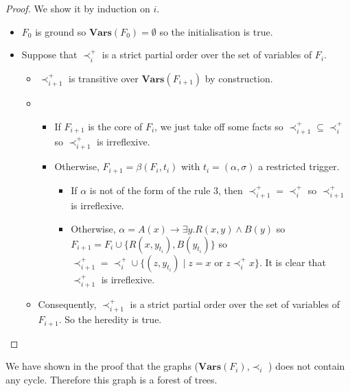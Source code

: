 \documentclass{article}
\theoremstyle{definition}
\newtheorem{definition}{Definition}[section]
\theoremstyle{remark}
\newcommand{\Vars}{\textbf{Vars}}
\begin{document}
\begin{proof}
We show it by induction on $i$.
\begin{itemize}
\item $F_0$ is ground so $\Vars(F_0) = \emptyset$ so the initialisation is true.
\item Suppose that $\prec^+_i$ is a strict partial order over the set of variables of $F_i$.
\begin{itemize}
\item $\prec^+_{i+1}$ is transitive over $\Vars(F_{i+1})$ by construction.
\item 
\begin{itemize}
\item If $F_{i+1}$ is the core of $F_i$, we just take off some facts so $\prec^+_{i+1} \subseteq \prec^+_{i}$  so $\prec^+_{i+1}$ is irreflexive.
\item Otherwise, $F_{i+1}= \beta(F_{i},t_i)$ with $t_i = (\alpha,\sigma)$ a restricted trigger. 
\begin{itemize}
\item If $\alpha$ is not of the form of the rule $3$, then $\prec^+_{i+1} = \prec^+_{i}$  so $\prec^+_{i+1}$ is irreflexive.
\item Otherwise, $\alpha = A(x) \rightarrow \exists y.R(x,y) \wedge B(y)$ so $F_{i+1} = F_i \cup \{R(x,y_{t_i}),B(y_{t_i})\}$ so $\prec^+_{i+1} = \prec^+_{i} \cup \{(z,y_{t_i}) \mid z = x$ or $z \prec_i^+ x\}$. It is clear that $\prec^+_{i+1}$ is irreflexive.
\end{itemize}
\end{itemize}

\item Consequently, $\prec^+_{i+1}$ is a strict partial order over the set of variables of $F_{i+1}$. So the heredity is true.
\end{itemize}
\end{itemize}
\end{proof}

We have shown in the proof that the graphs ($\Vars(F_i)$,$\prec_i$ ) does not contain any cycle. Therefore this graph is a forest of trees. 

%
\end{document}
